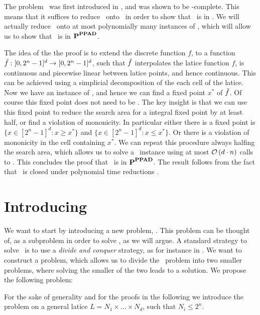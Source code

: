 The problem \Brouwer\ was first introduced in , and was shown to be \PPAD-complete. This means that it suffices to reduce \Tarski\ onto \Brouwer\ in order to show that \Tarski\ is in \PPAD. We will actually reduce \Tarski\ onto at most polynomially many instances of \Brouwer, which will allow us to show that \Tarski\ is in $\textbf{P}^{\textbf{PPAD}}$.

The idea of the the proof is to extend the discrete function $f$, to a function $\Tilde{f} : [0, 2^n - 1]^d \rightarrow [0, 2^n - 1]^d$, such that $\Tilde{f}$ interpolates the latice function $f$, is continuous and piecewise linear between latice points, and hence continuous. This can be achieved using a simplicial decomposition of the each cell of the latice. Now we have an instance of \Brouwer, and hence we can find a fixed point $x^*$ of $\Tilde{f}$. Of course this fixed point does not need to be .
The key insight is that we can use this fixed point to reduce the search area for a integral fixed point by at least half, or find a violation of mononicity. In particular either there is a fixed point is $\{x \in [2^n-1]^d : x \geq x^*\}$ and $\{x \in [2^n-1]^d : x \leq x^*\}$. Or there is a violation of mononicity in the cell containing $x^*$.
We can repeat this procedure always halfing the search area, which allows us to solve a \Tarski\ instance using at most $\mathcal{O}\left(d \cdot n\right)$ calls to \Brouwer. This concludes the proof that \Tarski\ is in $\textbf{P}^{\textbf{PPAD}}$. The result follows from the fact that \PPAD\ is closed under polynomial time reductions .

\section{Introducing \Tarskistar}

We want to start by introducing a new problem, \Tarskistar. This problem can be thought of, as a subproblem in order to solve \Tarski, as we will argue. A standard strategy to solve \Tarski\ is to use a \emph{divide and conquer} strategy, as for instance in . We want to construct a problem, which allows us to divide the \Tarski\ problem into two smaller problems, where solving the smaller of the two leads to a solution. We propose the following problem:

For the sake of generality and for the proofs in the following we introduce the problem on a general latice $L = N_1 \times \dots \times N_d$, such that $N_i \leq 2^n$.

